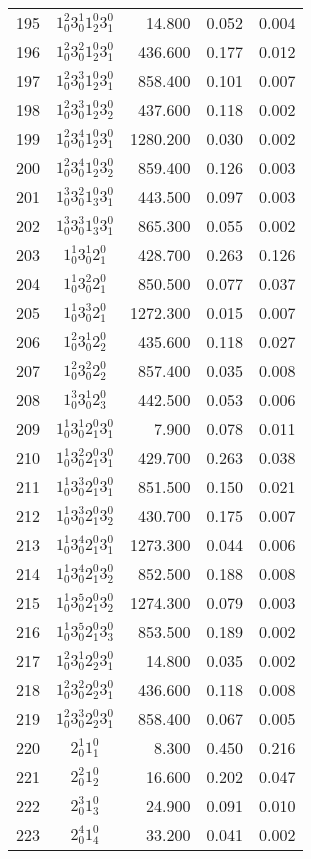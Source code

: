 \documentclass{revtex4}
\begin{document}
\begin{table}
\begin{tabular}{rcrrr}
195&$1_0^2 3_0^1 1_2^0 3_1^0$& 14.800& 0.052& 0.004\\
196&$1_0^2 3_0^2 1_2^0 3_1^0$& 436.600& 0.177& 0.012\\
197&$1_0^2 3_0^3 1_2^0 3_1^0$& 858.400& 0.101& 0.007\\
198&$1_0^2 3_0^3 1_2^0 3_2^0$& 437.600& 0.118& 0.002\\
199&$1_0^2 3_0^4 1_2^0 3_1^0$& 1280.200& 0.030& 0.002\\
200&$1_0^2 3_0^4 1_2^0 3_2^0$& 859.400& 0.126& 0.003\\
201&$1_0^3 3_0^2 1_3^0 3_1^0$& 443.500& 0.097& 0.003\\
202&$1_0^3 3_0^3 1_3^0 3_1^0$& 865.300& 0.055& 0.002\\
203&$1_0^1 3_0^1 2_1^0$& 428.700& 0.263& 0.126\\
204&$1_0^1 3_0^2 2_1^0$& 850.500& 0.077& 0.037\\
205&$1_0^1 3_0^3 2_1^0$& 1272.300& 0.015& 0.007\\
206&$1_0^2 3_0^1 2_2^0$& 435.600& 0.118& 0.027\\
207&$1_0^2 3_0^2 2_2^0$& 857.400& 0.035& 0.008\\
208&$1_0^3 3_0^1 2_3^0$& 442.500& 0.053& 0.006\\
209&$1_0^1 3_0^1 2_1^0 3_1^0$& 7.900& 0.078& 0.011\\
210&$1_0^1 3_0^2 2_1^0 3_1^0$& 429.700& 0.263& 0.038\\
211&$1_0^1 3_0^3 2_1^0 3_1^0$& 851.500& 0.150& 0.021\\
212&$1_0^1 3_0^3 2_1^0 3_2^0$& 430.700& 0.175& 0.007\\
213&$1_0^1 3_0^4 2_1^0 3_1^0$& 1273.300& 0.044& 0.006\\
214&$1_0^1 3_0^4 2_1^0 3_2^0$& 852.500& 0.188& 0.008\\
215&$1_0^1 3_0^5 2_1^0 3_2^0$& 1274.300& 0.079& 0.003\\
216&$1_0^1 3_0^5 2_1^0 3_3^0$& 853.500& 0.189& 0.002\\
217&$1_0^2 3_0^1 2_2^0 3_1^0$& 14.800& 0.035& 0.002\\
218&$1_0^2 3_0^2 2_2^0 3_1^0$& 436.600& 0.118& 0.008\\
219&$1_0^2 3_0^3 2_2^0 3_1^0$& 858.400& 0.067& 0.005\\
220&$2_0^1 1_1^0$& 8.300& 0.450& 0.216\\
221&$2_0^2 1_2^0$& 16.600& 0.202& 0.047\\
222&$2_0^3 1_3^0$& 24.900& 0.091& 0.010\\
223&$2_0^4 1_4^0$& 33.200& 0.041& 0.002\\

\end{tabular}
\end{table}
\end{document}

